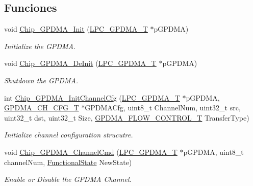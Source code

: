 \subsection*{Funciones}
\begin{DoxyCompactItemize}
\item 
void \hyperlink{group___g_p_d_m_a__18_x_x__43_x_x_ga21c99277e4579af4be9d9311a03b5542}{Chip\+\_\+\+G\+P\+D\+M\+A\+\_\+\+Init} (\hyperlink{struct_l_p_c___g_p_d_m_a___t}{L\+P\+C\+\_\+\+G\+P\+D\+M\+A\+\_\+T} $\ast$p\+G\+P\+D\+MA)
\begin{DoxyCompactList}\small\item\em Initialize the G\+P\+D\+MA. \end{DoxyCompactList}\item 
void \hyperlink{group___g_p_d_m_a__18_x_x__43_x_x_ga673cc6cab2ad87185f5f5d0ff8424075}{Chip\+\_\+\+G\+P\+D\+M\+A\+\_\+\+De\+Init} (\hyperlink{struct_l_p_c___g_p_d_m_a___t}{L\+P\+C\+\_\+\+G\+P\+D\+M\+A\+\_\+T} $\ast$p\+G\+P\+D\+MA)
\begin{DoxyCompactList}\small\item\em Shutdown the G\+P\+D\+MA. \end{DoxyCompactList}\item 
int \hyperlink{group___g_p_d_m_a__18_x_x__43_x_x_gac32ac477dbee2d3be93ca90b30db856c}{Chip\+\_\+\+G\+P\+D\+M\+A\+\_\+\+Init\+Channel\+Cfg} (\hyperlink{struct_l_p_c___g_p_d_m_a___t}{L\+P\+C\+\_\+\+G\+P\+D\+M\+A\+\_\+T} $\ast$p\+G\+P\+D\+MA, \hyperlink{struct_g_p_d_m_a___c_h___c_f_g___t}{G\+P\+D\+M\+A\+\_\+\+C\+H\+\_\+\+C\+F\+G\+\_\+T} $\ast$G\+P\+D\+M\+A\+Cfg, uint8\+\_\+t Channel\+Num, uint32\+\_\+t src, uint32\+\_\+t dst, uint32\+\_\+t Size, \hyperlink{group___g_p_d_m_a__18_x_x__43_x_x_ga2cb59b641cd840f22780c44be1208133}{G\+P\+D\+M\+A\+\_\+\+F\+L\+O\+W\+\_\+\+C\+O\+N\+T\+R\+O\+L\+\_\+T} Transfer\+Type)
\begin{DoxyCompactList}\small\item\em Initialize channel configuration strucutre. \end{DoxyCompactList}\item 
void \hyperlink{group___g_p_d_m_a__18_x_x__43_x_x_gae93a1b9cb8ee1a04176ce51a9a4ad073}{Chip\+\_\+\+G\+P\+D\+M\+A\+\_\+\+Channel\+Cmd} (\hyperlink{struct_l_p_c___g_p_d_m_a___t}{L\+P\+C\+\_\+\+G\+P\+D\+M\+A\+\_\+T} $\ast$p\+G\+P\+D\+MA, uint8\+\_\+t channel\+Num, \hyperlink{group___l_p_c___types___public___types_gac9a7e9a35d2513ec15c3b537aaa4fba1}{Functional\+State} New\+State)
\begin{DoxyCompactList}\small\item\em Enable or Disable the G\+P\+D\+MA Channel. \end{DoxyCompactList}\item 

\end{DoxyCompactItemize}
